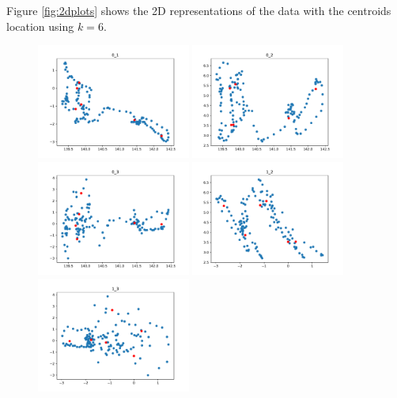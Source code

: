 \documentclass[11pt]{amsart}
\begin{document}
Figure \ref{fig:2dplots} shows the 2D representations of the data with the centroids location using $k=6$.
\begin{figure}
    \includegraphics[width=0.45\textwidth]{../plots/0_1.pdf}
    \includegraphics[width=0.45\textwidth]{../plots/0_2.pdf}
    \includegraphics[width=0.45\textwidth]{../plots/0_3.pdf}
    \includegraphics[width=0.45\textwidth]{../plots/1_2.pdf}
    \includegraphics[width=0.45\textwidth]{../plots/1_3.pdf}

\end{figure}
\end{document}
